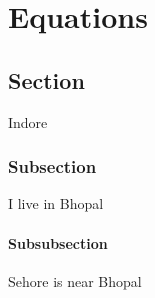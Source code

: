 \chapter{Equations}

   \section{Section}
        Indore
        \subsection{Subsection}
            I live in Bhopal
        \subsubsection{Subsubsection}
            Sehore is near Bhopal
